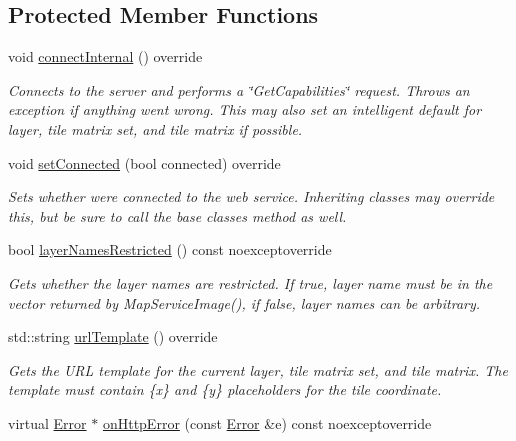 \subsection*{Protected Member Functions}
\begin{DoxyCompactItemize}
\item 
void \hyperlink{classdg_1_1deepcore_1_1imagery_1_1_wmts_client_a455a22a51644b4f89a70c163141cc3a1}{connect\+Internal} () override
\begin{DoxyCompactList}\small\item\em Connects to the server and performs a \char`\"{}\+Get\+Capabilities\char`\"{} request. Throws an exception if anything went wrong. This may also set an intelligent default for layer, tile matrix set, and tile matrix if possible. \end{DoxyCompactList}\item 
void \hyperlink{classdg_1_1deepcore_1_1imagery_1_1_wmts_client_aad9106986ebd3f1af5ee9b4f2a756ba4}{set\+Connected} (bool connected) override
\begin{DoxyCompactList}\small\item\em Sets whether we\textquotesingle{}re connected to the web service. Inheriting classes may override this, but be sure to call the base classe\textquotesingle{}s method as well. \end{DoxyCompactList}\item 
bool \hyperlink{classdg_1_1deepcore_1_1imagery_1_1_wmts_client_af896545533026802ea688f59f170aa0f}{layer\+Names\+Restricted} () const noexceptoverride
\begin{DoxyCompactList}\small\item\em Gets whether the layer names are restricted. If true, layer name must be in the vector returned by Map\+Service\+Image(), if false, layer names can be arbitrary. \end{DoxyCompactList}\item 
std\+::string \hyperlink{classdg_1_1deepcore_1_1imagery_1_1_wmts_client_ae9ec4a090ea93422dd3beec62c50f5bc}{url\+Template} () override
\begin{DoxyCompactList}\small\item\em Gets the U\+RL template for the current layer, tile matrix set, and tile matrix. The template must contain \{x\} and \{y\} placeholders for the tile coordinate. \end{DoxyCompactList}\item 
virtual \hyperlink{classdg_1_1deepcore_1_1_error}{Error} $\ast$ \hyperlink{classdg_1_1deepcore_1_1imagery_1_1_wmts_client_ae8429816853b38f7bdb29c1a75daebe5}{on\+Http\+Error} (const \hyperlink{classdg_1_1deepcore_1_1_error}{Error} \&e) const noexceptoverride

\end{DoxyCompactItemize}
